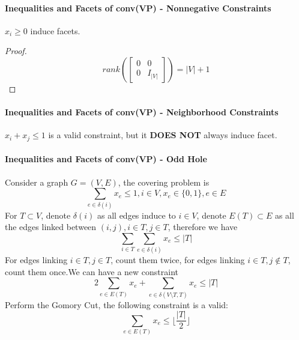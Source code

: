             \paragraph{Inequalities and Facets of conv(VP) - Nonnegative Constraints}
                $x_i \ge 0$ induce facets.\\
                \begin{proof}
                    \begin{equation*}
                        rank\left(\left[\begin{matrix}0 & 0 \\ 0 & I_{|V|}\end{matrix}\right]\right) = |V| + 1 \nonumber
                    \end{equation*}    
                \end{proof}               

            \paragraph{Inequalities and Facets of conv(VP) - Neighborhood Constraints}
                $x_i + x_j \le 1$ is a valid constraint, but it \textbf{DOES NOT} always induce facet.

            \paragraph{Inequalities and Facets of conv(VP) - Odd Hole}
                Consider a graph $G=(V, E)$, the covering problem is
                \begin{equation*}
                    \sum_{e\in \delta(i)}x_e \le 1, i\in V, x_e\in \{0, 1\}, e\in E\nonumber
                \end{equation*}
                For $T\subset V$, denote $\delta(i)$ as all edges induce to $i\in V$, denote $E(T) \subset E$ as all the edges linked between $(i, j), i\in T, j\in T$, therefore we have
                \begin{equation*}
                    \sum_{i\in T}\sum_{e\in \delta(i)}x_e \le |T| \nonumber
                \end{equation*}
                For edges linking $i \in T, j \in T$, count them twice, for edges linking $i\in T, j\notin T$, count them once.We can have a new constraint
                \begin{equation*}
                    2\sum_{e\in E(T)}x_e + \sum_{e\in \delta(V\setminus T, T)}x_e \le |T| \nonumber
                \end{equation*}
                Perform the Gomory Cut, the following constraint is a valid:
                \begin{equation*}
                    \sum_{e\in E(T)}x_e \le \lfloor \frac{|T|}2 \rfloor \nonumber
                \end{equation*}

